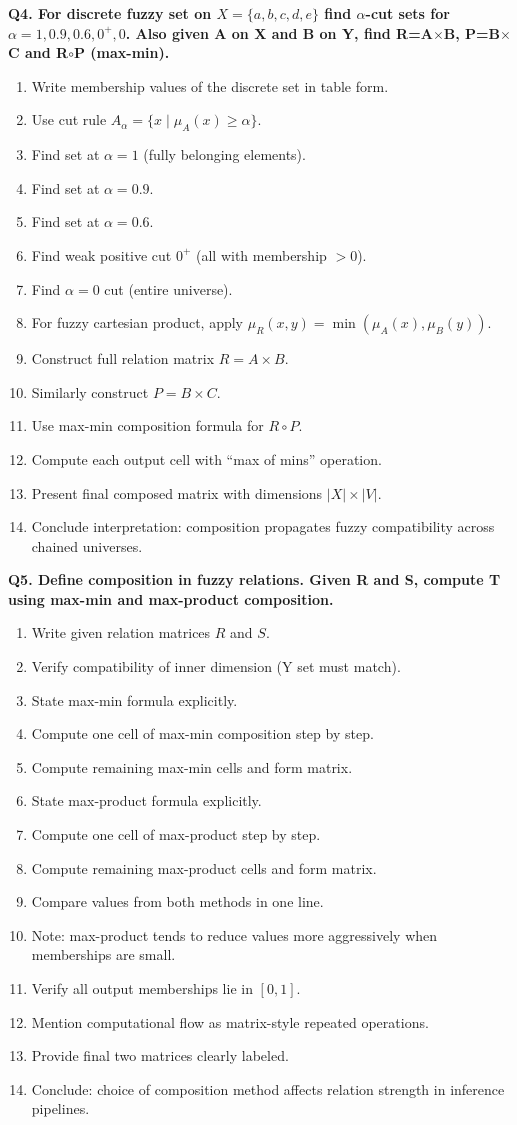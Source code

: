 \documentclass[11pt,a4paper]{article}
\begin{document}
\textbf{Q4. For discrete fuzzy set on $X=\{a,b,c,d,e\}$ find $\alpha$-cut sets for $\alpha=1,0.9,0.6,0^+,0$. Also given A on X and B on Y, find R=A$\times$B, P=B$\times$C and R$\circ$P (max-min).}
\begin{enumerate}
\item Write membership values of the discrete set in table form.
\item Use cut rule $A_\alpha=\{x\mid\mu_A(x)\ge\alpha\}$.
\item Find set at $\alpha=1$ (fully belonging elements).
\item Find set at $\alpha=0.9$.
\item Find set at $\alpha=0.6$.
\item Find weak positive cut $0^+$ (all with membership $>0$).
\item Find $\alpha=0$ cut (entire universe).
\item For fuzzy cartesian product, apply $\mu_R(x,y)=\min(\mu_A(x),\mu_B(y))$.
\item Construct full relation matrix $R=A\times B$.
\item Similarly construct $P=B\times C$.
\item Use max-min composition formula for $R\circ P$.
\item Compute each output cell with ``max of mins'' operation.
\item Present final composed matrix with dimensions $|X|\times|V|$.
\item Conclude interpretation: composition propagates fuzzy compatibility across chained universes.
\end{enumerate}

\textbf{Q5. Define composition in fuzzy relations. Given R and S, compute T using max-min and max-product composition.}
\begin{enumerate}
\item Write given relation matrices $R$ and $S$.
\item Verify compatibility of inner dimension (Y set must match).
\item State max-min formula explicitly.
\item Compute one cell of max-min composition step by step.
\item Compute remaining max-min cells and form matrix.
\item State max-product formula explicitly.
\item Compute one cell of max-product step by step.
\item Compute remaining max-product cells and form matrix.
\item Compare values from both methods in one line.
\item Note: max-product tends to reduce values more aggressively when memberships are small.
\item Verify all output memberships lie in $[0,1]$.
\item Mention computational flow as matrix-style repeated operations.
\item Provide final two matrices clearly labeled.
\item Conclude: choice of composition method affects relation strength in inference pipelines.
\end{enumerate}
\end{document}
